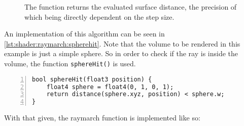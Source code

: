 \begin{figure}[H]
    \centering
    \caption{The function returns the evaluated surface distance, the precision of which being directly dependent on the step size.}
\end{figure}

\noindent
An implementation of this algorithm can be seen in \autoref{lst:shader:raymarch:spherehit}. Note that the volume to be rendered in this example is just a simple sphere.
So in order to check if the ray is inside the volume, the function \lstinline[language=HLSL]{sphereHit()} is used.
\begin{lstlisting}[language=HLSL, numbers=left, caption=The function returns true if the ray is inside the volume.,captionpos=b, label=lst:shader:raymarch:constantstep]
bool sphereHit(float3 position) {
    float4 sphere = float4(0, 1, 0, 1);
    return distance(sphere.xyz, position) < sphere.w;
}
\end{lstlisting}

\noindent
\newline 
With that given, the raymarch function is implemented like so:

